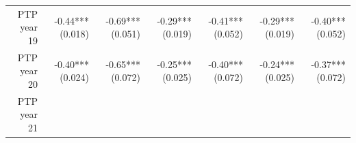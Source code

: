 \documentclass[]{article}
\begin{document}
\begin{longtable}[c]{@{}rrrrrrr@{}}
\begin{minipage}[t]{0.12\columnwidth}
PTP year 19
\strut\end{minipage} &
\begin{minipage}[t]{0.11\columnwidth}\raggedleft\strut
-0.44*** (0.018)
\strut\end{minipage} &
\begin{minipage}[t]{0.12\columnwidth}\raggedleft\strut
-0.69*** (0.051)
\strut\end{minipage} &
\begin{minipage}[t]{0.11\columnwidth}\raggedleft\strut
-0.29*** (0.019)
\strut\end{minipage} &
\begin{minipage}[t]{0.12\columnwidth}\raggedleft\strut
-0.41*** (0.052)
\strut\end{minipage} &
\begin{minipage}[t]{0.11\columnwidth}\raggedleft\strut
-0.29*** (0.019)
\strut\end{minipage} &
\begin{minipage}[t]{0.11\columnwidth}\raggedleft\strut
-0.40*** (0.052)
\strut\end{minipage}\tabularnewline
\begin{minipage}[t]{0.12\columnwidth}\raggedleft\strut
PTP year 20
\strut\end{minipage} &
\begin{minipage}[t]{0.11\columnwidth}\raggedleft\strut
-0.40*** (0.024)
\strut\end{minipage} &
\begin{minipage}[t]{0.12\columnwidth}\raggedleft\strut
-0.65*** (0.072)
\strut\end{minipage} &
\begin{minipage}[t]{0.11\columnwidth}\raggedleft\strut
-0.25*** (0.025)
\strut\end{minipage} &
\begin{minipage}[t]{0.12\columnwidth}\raggedleft\strut
-0.40*** (0.072)
\strut\end{minipage} &
\begin{minipage}[t]{0.11\columnwidth}\raggedleft\strut
-0.24*** (0.025)
\strut\end{minipage} &
\begin{minipage}[t]{0.11\columnwidth}\raggedleft\strut
-0.37*** (0.072)
\strut\end{minipage}\tabularnewline
\begin{minipage}[t]{0.12\columnwidth}\raggedleft\strut
PTP year 21
\strut\end{minipage} &
\begin{minipage}[t]{0.11\columnwidth}\raggedleft\strut

\end{minipage}
\end{longtable}
\end{document}
